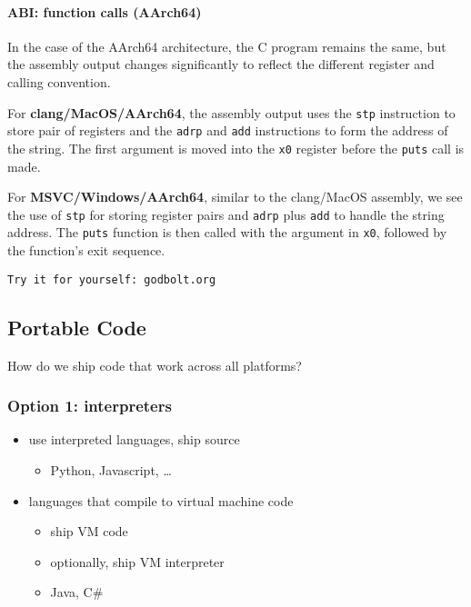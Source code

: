 \documentclass[12pt]{article}
\begin{document}
\paragraph{ABI: function calls (AArch64)}

In the case of the AArch64 architecture, the C program remains the same, but the assembly output changes significantly to reflect the different register and calling convention.

For \textbf{clang/MacOS/AArch64}, the assembly output uses the \texttt{stp} instruction to store pair of registers and the \texttt{adrp} and \texttt{add} instructions to form the address of the string. The first argument is moved into the \texttt{x0} register before the \texttt{puts} call is made.

For \textbf{MSVC/Windows/AArch64}, similar to the clang/MacOS assembly, we see the use of \texttt{stp} for storing register pairs and \texttt{adrp} plus \texttt{add} to handle the string address. The \texttt{puts} function is then called with the argument in \texttt{x0}, followed by the function's exit sequence.

\texttt{Try it for yourself: godbolt.org}

\subsection{Portable Code}

How do we ship code that work across all platforms?


\subsubsection{Option 1: interpreters}
\begin{itemize}
  \item use interpreted languages, ship source
  \begin{itemize}
    \item Python, Javascript, \ldots
  \end{itemize}
  \item languages that compile to virtual machine code
  \begin{itemize}
    \item ship VM code
    \item optionally, ship VM interpreter
    \item Java, C\#
  \end{itemize}
\end{itemize}
\end{document}
